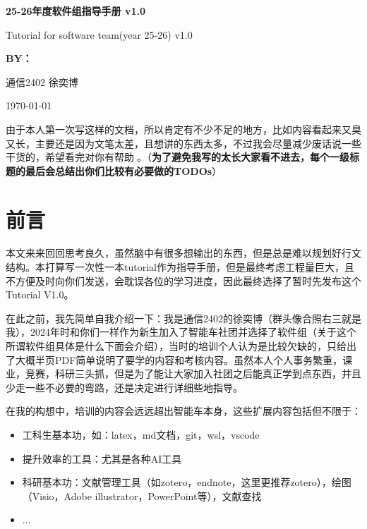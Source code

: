 \documentclass[a4paper,12pt]{article}
\newcommand{\emoji}[1]{{\EmojiFont #1}}
\begin{document}
\begin{titlepage}
\vspace{2cm}

{\LARGE\textbf{\textcolor{smartblue}{25-26年度软件组指导手册 v1.0}}\par}
\vspace{0.5cm}
{\large\textcolor{smartgray}{Tutorial for software team(year 25-26) v1.0}\par}

\vspace{3cm}

{\large\textbf{BY：}\par}
\vspace{0.5cm}
{\large 通信2402 徐奕博\par}

\vspace{1.5cm}

{\large\textcolor{smartgray}{\today}\par}

\end{titlepage}

\newpage
\tableofcontents
\newpage


由于本人第一次写这样的文档，所以肯定有不少不足的地方，比如内容看起来又臭又长，主要还是因为文笔太差，且想讲的东西太多，不过我会尽量减少废话说一些干货的，希望看完对你有帮助\emoji{🥹}。（\textbf{为了避免我写的太长大家看不进去，每个一级标题的最后会总结出你们比较有必要做的TODOs}）

\section{前言}

本文来来回回思考良久，虽然脑中有很多想输出的东西，但是总是难以规划好行文结构。本打算写一次性一本tutorial作为指导手册，但是最终考虑工程量巨大，且不方便及时向你们发送，会耽误各位的学习进度，因此最终选择了暂时先发布这个Tutorial V1.0。

在此之前，我先简单自我介绍一下：我是通信2402的徐奕博（群头像合照右三就是我），2024年时和你们一样作为新生加入了智能车社团并选择了软件组（关于这个所谓软件组具体是什么下面会介绍），当时的培训个人认为是比较欠缺的，只给出了大概半页PDF简单说明了要学的内容和考核内容。虽然本人个人事务繁重，课业，竞赛，科研三头抓，但是为了能让大家加入社团之后能真正学到点东西，并且少走一些不必要的弯路，还是决定进行详细些地指导。

在我的构想中，培训的内容会远远超出智能车本身，这些扩展内容包括但不限于：
\begin{itemize}
    \item 工科生基本功，如：latex，md文档，git，wsl，vscode
    \item 提升效率的工具：尤其是各种AI工具
    \item 科研基本功：文献管理工具（如zotero，endnote，这里更推荐zotero），绘图（Visio，Adobe illustrator，PowerPoint等），文献查找
    \item ...
\end{itemize}
\end{document}
